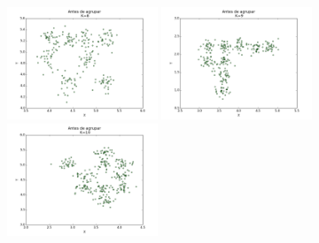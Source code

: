 \documentclass[12pt, a4paper]{article}
\begin{document}
\begin{landscape}
\begin{figure}[!ht]
    \includegraphics[width=0.4\textwidth]{antes_k8.png}    
    \includegraphics[width=0.4\textwidth]{antes_k9.png}
    \includegraphics[width=0.4\textwidth]{antes_k10.png}          
\end{figure}
\end{landscape}
\end{document}
